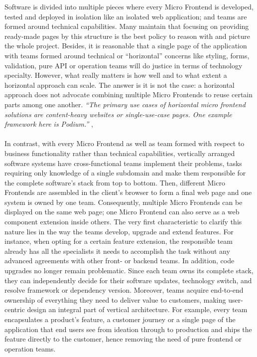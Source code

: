 \documentclass[a4paper]{book}
\begin{document}
Software is divided into multiple pieces where every Micro Frontend is developed, tested and deployed in isolation like an isolated web application; and teams are formed around technical capabilities. Many maintain that focusing on providing ready-made pages by this structure is the best policy to reason with and picture the whole project. Besides, it is reasonable that a single page of the application with teams formed around technical or “horizontal” concerns like styling, forms, validation, pure API or operation teams will do justice in terms of technology specialty. However, what really matters is how well and to what extent a horizontal approach can scale. The answer is it is not the case: a horizontal approach does not advocate combining multiple Micro Frontends to reuse certain parts among one another. \textit{“The primary use cases of horizontal micro frontend solutions are content-heavy websites or single-use-case pages. One example framework here is Podium.”} \cite{Rap20}, \cite{Podium}
\\ 
\\
In contrast, with every Micro Frontend as well as team formed with respect to business functionality rather than technical capabilities, vertically arranged software systems have cross-functional teams implement their problems, tasks requiring only knowledge of a single subdomain and make them responsible for the complete software’s stack from top to bottom. Then, different Micro Frontends are assembled in the client’s browser to form a final web page and one system is owned by one team. Consequently, multiple Micro Frontends can be displayed on the same web page; one Micro Frontend can also serve as a web component extension inside others. The very first characteristic to clarify this nature lies in the way the teams develop, upgrade and extend features. For instance, when opting for a certain feature extension, the responsible team already has all the specialists it needs to accomplish the task without any advanced agreements with other front- or backend teams. In addition, code upgrades no longer remain problematic. Since each team owns its complete stack, they can independently decide for their software updates, technology switch, and resolve framework or dependency version. Moreover, teams acquire end-to-end ownership of everything they need to deliver value to customers, making user-centric design an integral part of vertical architecture. For example, every team encapsulates a product's feature, a customer journey or a single page of the application that end users see from ideation through to production and ships the feature directly to the customer, hence removing the need of pure frontend or operation teams. 
\end{document}

